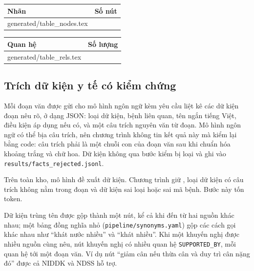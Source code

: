 \documentclass[11pt,a4paper]{article}
\makeatletter
\newcommand{\tablerows}[1]{\@@input #1 }
\makeatother
\begin{document}
\begin{table}[H]
\centering
\begin{minipage}[t]{0.42\linewidth}\centering
{}
\begin{tabular}{lr}
\toprule
Nhãn & Số nút \\
\midrule
\tablerows{generated/table_nodes.tex}
\bottomrule
\end{tabular}
\end{minipage}\hfill
\begin{minipage}[t]{0.52\linewidth}\centering
{}
\begin{tabular}{lr}
\toprule
Quan hệ & Số lượng \\
\midrule
\tablerows{generated/table_rels.tex}
\bottomrule
\end{tabular}
\end{minipage}
\end{table}

\subsection{Trích dữ kiện y tế có kiểm chứng}

Mỗi đoạn văn được gửi cho mô hình ngôn ngữ \texttt{\llmModel} kèm yêu cầu liệt kê các dữ kiện đoạn nêu rõ, ở dạng
JSON: loại dữ kiện, bệnh liên quan, tên ngắn tiếng Việt, điều kiện áp dụng nếu có, và một câu trích nguyên văn từ
đoạn. Mô hình ngôn ngữ có thể bịa câu trích, nên chương trình không tin kết quả này mà kiểm lại bằng code: câu trích
phải là một chuỗi con của đoạn văn sau khi chuẩn hóa khoảng trắng và chữ hoa. Dữ kiện không qua bước kiểm bị loại và
ghi vào \texttt{results/facts\_rejected.jsonl}.

\begin{softbox}
Trên toàn kho, mô hình đề xuất \nProposed{} dữ kiện. Chương trình giữ \nAccepted{}, loại \nRejQuote{} dữ kiện có câu
trích không nằm trong đoạn và \nRejOther{} dữ kiện sai loại hoặc sai mã bệnh. Bước này tốn \extractTokens{} token.
\end{softbox}

Dữ kiện trùng tên được gộp thành một nút, kể cả khi đến từ hai nguồn khác nhau; một bảng đồng nghĩa nhỏ
(\texttt{pipeline/synonyms.yaml}) gộp các cách gọi khác nhau như “khát nước nhiều” và “khát nhiều”. Khi một
khuyến nghị được nhiều nguồn cùng nêu, nút khuyến nghị có nhiều quan hệ \texttt{SUPPORTED\_BY}, mỗi quan hệ tới
một đoạn văn. Ví dụ nút “giảm cân nếu thừa cân và duy trì cân nặng đó” được cả NIDDK và NDSS hỗ trợ.
\end{document}
